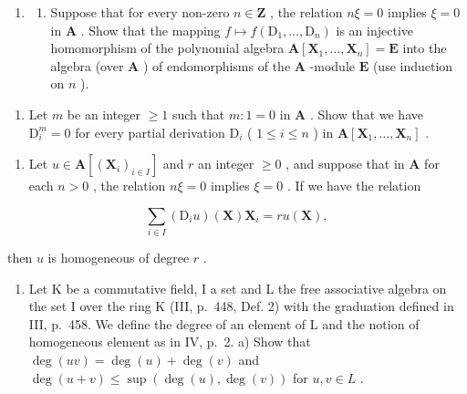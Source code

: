 \begin{enumerate}
\def\labelenumi{\arabic{enumi})}
\setcounter{enumi}{3}
\tightlist
\item
  \begin{enumerate}
  \def\labelenumii{\alph{enumii})}
  \tightlist
  \item
    Suppose that for every non-zero \(n \in \mathbf{Z}\) , the relation \(n\xi = 0\) implies \(\xi = 0\) in \(\mathbf{A}\) . Show that the mapping \(f \mapsto f(\mathrm{D}_1, \ldots, \mathrm{D}_n)\) is an injective homomorphism of the polynomial algebra \(\mathbf{A}[\mathbf{X}_1, \ldots, \mathbf{X}_n] = \mathbf{E}\) into the algebra (over \(\mathbf{A}\) ) of endomorphisms of the \(\mathbf{A}\) -module \(\mathbf{E}\) (use induction on \(n\) ).
  \end{enumerate}
\end{enumerate}

\begin{enumerate}
\def\labelenumi{\alph{enumi})}
\setcounter{enumi}{1}
\tightlist
\item
  Let \(m\) be an integer \(\geqslant 1\) such that \(m: 1 = 0\) in \(\mathbf{A}\) . Show that we have \(\mathrm{D}_i^m = 0\) for every partial derivation \(\mathrm{D}_i\) ( \(1 \leqslant i \leqslant n\) ) in \(\mathbf{A}[\mathbf{X}_1, \ldots, \mathbf{X}_n]\) .
\end{enumerate}

\begin{enumerate}
\def\labelenumi{\arabic{enumi})}
\setcounter{enumi}{4}
\tightlist
\item
  Let \(u \in \mathbf{A}[(\mathbf{X}_i)_{i \in I}]\) and \(r\) an integer \(\geqslant 0\) , and suppose that in \(\mathbf{A}\) for each \(n > 0\) , the relation \(n\xi = 0\) implies \(\xi = 0\) . If we have the relation
\end{enumerate}

\[
\sum_ {i \in I} \left(\mathrm{D} _ {i} u\right) (\mathbf {X}) \mathbf {X} _ {i} = r u (\mathbf {X}),
\]

then \(u\) is homogeneous of degree \(r\) .

\begin{enumerate}
\def\labelenumi{\arabic{enumi})}
\setcounter{enumi}{5}
\tightlist
\item
  Let K be a commutative field, I a set and L the free associative algebra on the set I over the ring K (III, p.~448, Def. 2) with the graduation defined in III, p.~458. We define the degree of an element of L and the notion of homogeneous element as in IV, p.~2. a) Show that \(\deg(uv) = \deg(u) + \deg(v)\) and \(\deg(u + v) \leqslant \sup(\deg(u), \deg(v))\) for \(u, v \in L\) .
\end{enumerate}

